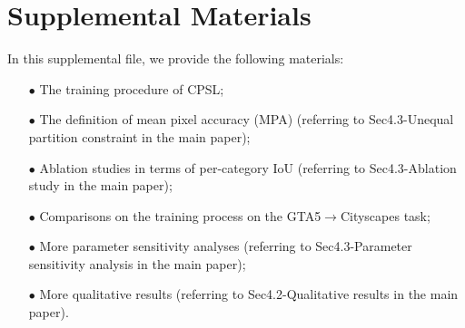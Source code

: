 \documentclass[10pt,twocolumn,letterpaper]{article}
\begin{document}



\clearpage
\section{Supplemental Materials}
	In this supplemental file, we provide the following materials:
	\begin{itemize}\item[$\bullet$] The training procedure of CPSL;
		\item[$\bullet$] The definition of mean pixel accuracy (MPA) (referring to Sec4.3-Unequal partition constraint in the main paper);
		\item[$\bullet$] Ablation studies in terms of per-category IoU (referring to Sec4.3-Ablation study in the main paper);
		\item[$\bullet$] Comparisons on the training process on the GTA5$\to$Cityscapes task;
		\item[$\bullet$] More parameter sensitivity analyses (referring to Sec4.3-Parameter sensitivity analysis in the main paper);
		\item[$\bullet$] More qualitative results (referring to Sec4.2-Qualitative results  in the main paper).
	\end{itemize}
\end{document}
